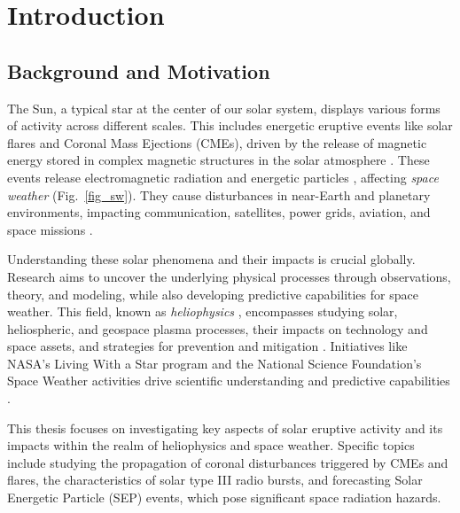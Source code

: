 \chapter{Introduction}
\label{chapter1}

\section{Background and Motivation}
The Sun, a typical star at the center of our solar system, displays various forms of activity across different scales. This includes energetic eruptive events like solar flares and Coronal Mass Ejections (CMEs), driven by the release of magnetic energy stored in complex magnetic structures in the solar atmosphere \citep{moore_2001, priest_forbes_2007, zhang_2012, amari_2014}. These events release electromagnetic radiation and energetic particles \citep{schwenn_2006, pulkkinen_2007}, affecting \textit{space weather} \citep{schrijver_2010, eastwood_2017} (Fig.~\ref{fig_sw}). They cause disturbances in near-Earth and planetary environments, impacting communication, satellites, power grids, aviation, and space missions \citep{lanzerotti_2001, schwenn_2006, pulkkinen_2007, lilensten_2014}.

Understanding these solar phenomena and their impacts is crucial globally. Research aims to uncover the underlying physical processes through observations, theory, and modeling, while also developing predictive capabilities for space weather. This field, known as \textit{heliophysics} \citep{schrijver_siscoe_2010}, encompasses studying solar, heliospheric, and geospace plasma processes, their impacts on technology and space assets, and strategies for prevention and mitigation \citep{schrijver_2015a, schrijver_2015b}. Initiatives like NASA's Living With a Star program and the National Science Foundation's Space Weather activities drive scientific understanding and predictive capabilities \citep{brewer_2002}.

This thesis focuses on investigating key aspects of solar eruptive activity and its impacts within the realm of heliophysics and space weather. Specific topics include studying the propagation of coronal disturbances triggered by CMEs and flares, the characteristics of solar type III radio bursts, and forecasting Solar Energetic Particle (SEP) events, which pose significant space radiation hazards.

